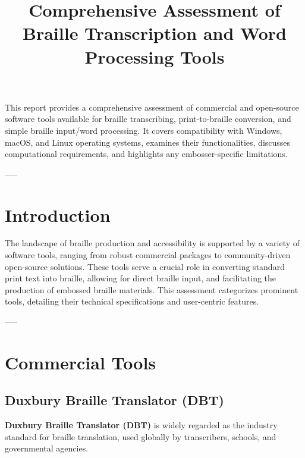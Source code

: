 \title{Comprehensive Assessment of Braille Transcription and Word Processing Tools}

This report provides a comprehensive assessment of commercial and open-source software tools available for braille transcribing, print-to-braille conversion, and simple braille input/word processing. It covers compatibility with Windows, macOS, and Linux operating systems, examines their functionalities, discusses computational requirements, and highlights any embosser-specific limitations.

-----

\section{Introduction}
The landscape of braille production and accessibility is supported by a variety of software tools, ranging from robust commercial packages to community-driven open-source solutions. These tools serve a crucial role in converting standard print text into braille, allowing for direct braille input, and facilitating the production of embossed braille materials. This assessment categorizes prominent tools, detailing their technical specifications and user-centric features.

-----

\section{Commercial Tools}

\subsection{Duxbury Braille Translator (DBT)}
\textbf{Duxbury Braille Translator (DBT)} is widely regarded as the industry standard for braille translation, used globally by transcribers, schools, and governmental agencies.

